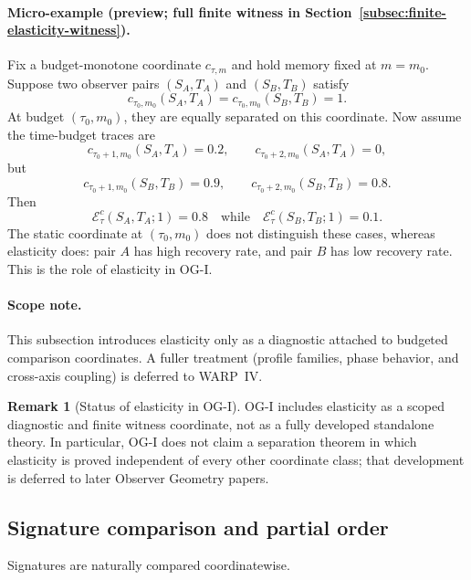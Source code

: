 \documentclass[11pt,twoside]{article}
\theoremstyle{definition}
\newtheorem{remark}[theorem]{Remark}
\begin{document}
\paragraph{Micro-example (preview; full finite witness in Section~\ref{subsec:finite-elasticity-witness}).}
Fix a budget-monotone coordinate \(c_{\tau,m}\) and hold memory fixed at \(m=m_0\). Suppose two observer pairs \((S_A,T_A)\) and \((S_B,T_B)\) satisfy
\[
  c_{\tau_0,m_0}(S_A,T_A)
  =
  c_{\tau_0,m_0}(S_B,T_B)
  =
  1.
\]
At budget \((\tau_0,m_0)\), they are equally separated on this coordinate. Now assume the time-budget traces are
\[
  c_{\tau_0+1,m_0}(S_A,T_A)=0.2,\qquad
  c_{\tau_0+2,m_0}(S_A,T_A)=0,
\]
but
\[
  c_{\tau_0+1,m_0}(S_B,T_B)=0.9,\qquad
  c_{\tau_0+2,m_0}(S_B,T_B)=0.8.
\]
Then
\[
  \mathcal{E}^{c}_{\tau}(S_A,T_A;1)=0.8
  \quad\text{while}\quad
  \mathcal{E}^{c}_{\tau}(S_B,T_B;1)=0.1.
\]
The static coordinate at \((\tau_0,m_0)\) does not distinguish these cases, whereas elasticity does: pair \(A\) has high recovery rate, and pair \(B\) has low recovery rate. This is the role of elasticity in OG-I.

\paragraph{Scope note.}
This subsection introduces elasticity only as a diagnostic attached to budgeted comparison coordinates. A fuller treatment (profile families, phase behavior, and cross-axis coupling) is deferred to WARP~IV.

\begin{remark}[Status of elasticity in OG-I]
\label{rem:elasticity-status-og1}
OG-I includes elasticity as a scoped diagnostic and finite witness coordinate, not as a fully developed standalone theory. In particular, OG-I does not claim a separation theorem in which elasticity is proved independent of every other coordinate class; that development is deferred to later Observer Geometry papers.
\end{remark}

\subsection{Signature comparison and partial order}
\label{subsec:signature-partial-order}

Signatures are naturally compared coordinatewise.
\end{document}
